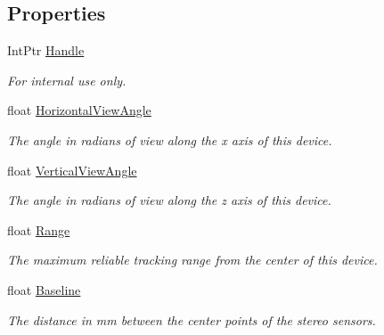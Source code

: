 \subsection*{Properties}
\begin{DoxyCompactItemize}
\item 
Int\+Ptr \mbox{\hyperlink{class_leap_1_1_device_ab09f55eeeb8cb9eac332cda57b3ece46}{Handle}}
\begin{DoxyCompactList}\small\item\em For internal use only. \end{DoxyCompactList}\item 
float \mbox{\hyperlink{class_leap_1_1_device_aed0377f4ce57d410cc561e76a05cd3c0}{Horizontal\+View\+Angle}}
\begin{DoxyCompactList}\small\item\em The angle in radians of view along the x axis of this device. \end{DoxyCompactList}\item 
float \mbox{\hyperlink{class_leap_1_1_device_a98badb22460d2fac5fc8e3539b7d035f}{Vertical\+View\+Angle}}
\begin{DoxyCompactList}\small\item\em The angle in radians of view along the z axis of this device. \end{DoxyCompactList}\item 
float \mbox{\hyperlink{class_leap_1_1_device_a8729f506b9a31c00af2143dc47704b88}{Range}}
\begin{DoxyCompactList}\small\item\em The maximum reliable tracking range from the center of this device. \end{DoxyCompactList}\item 
float \mbox{\hyperlink{class_leap_1_1_device_a94d74a3c07a217a1aca1e4c88852f546}{Baseline}}
\begin{DoxyCompactList}\small\item\em The distance in mm between the center points of the stereo sensors. \end{DoxyCompactList}\item 

\end{DoxyCompactItemize}
